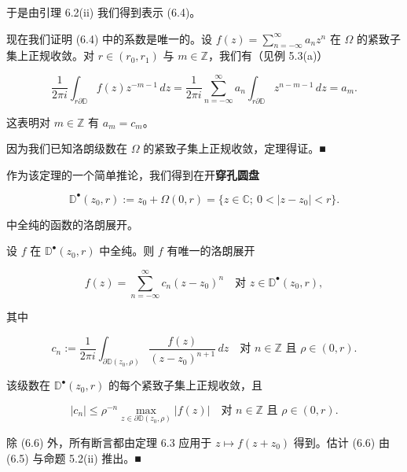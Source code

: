 \begin{theorem}
\begin{subitems}
于是由引理 6.2(ii) 我们得到表示 (6.4)。

\item

现在我们证明 (6.4) 中的系数是唯一的。设 $ f(z) = \sum_{n=-\infty}^{\infty} a_{n}z^{n} $ 在 $ \Omega $ 的紧致子集上正规收敛。对 $ r \in (r_{0},r_{1}) $ 与 $ m \in \mathbb{Z} $，我们有（见例 5.3(a)）

\[
\frac{1}{2\pi i}\int_{r\partial\mathbb{D}} f(z)z^{-m-1}\,dz = \frac{1}{2\pi i}\sum_{n=-\infty}^{\infty} a_{n}\int_{r\partial\mathbb{D}} z^{n-m-1}\,dz = a_{m} .
\]

这表明对 $ m \in \mathbb{Z} $ 有 $ a_{m} = c_{m} $。

\item

因为我们已知洛朗级数在 $ \Omega $ 的紧致子集上正规收敛，定理得证。\nobreak\hspace{0.35em}■

\end{subitems}

\end{theorem}

作为该定理的一个简单推论，我们得到在开\textbf{穿孔圆盘}

\[
\mathbb{D}^{\bullet}(z_{0},r) := z_{0} + \Omega(0,r) = \{ z \in \mathbb{C} ;\ 0 < |z - z_{0}| < r \} .
\]

中全纯的函数的洛朗展开。

\begin{corollary}

设 $ f $ 在 $ \mathbb{D}^{\bullet}(z_{0},r) $ 中全纯。则 $ f $ 有唯一的洛朗展开

\[
f(z) = \sum_{n=-\infty}^{\infty} c_{n}(z - z_{0})^{n} \quad\text{对 } z \in \mathbb{D}^{\bullet}(z_{0},r) ,
\]

其中

\[
c_{n} := \frac{1}{2\pi i}\int_{\partial\mathbb{D}(z_{0},\rho)}\frac{f(z)}{(z - z_{0})^{n+1}}\,dz \quad\text{对 } n \in \mathbb{Z} \text{ 且 } \rho \in (0,r) .
\]

该级数在 $ \mathbb{D}^{\bullet}(z_{0},r) $ 的每个紧致子集上正规收敛，且

\begin{equation}
|c_{n}| \le \rho^{-n}\max_{z\in\partial\mathbb{D}(z_{0},\rho)}|f(z)| \quad\text{对 } n \in \mathbb{Z} \text{ 且 } \rho \in (0,r) .\tag{6.6}
\end{equation}

\proofhead
除 (6.6) 外，所有断言都由定理 6.3 应用于 $ z \mapsto f(z + z_{0}) $ 得到。估计 (6.6) 由 (6.5) 与命题 5.2(ii) 推出。\nobreak\hspace{0.35em}■
\end{corollary}

